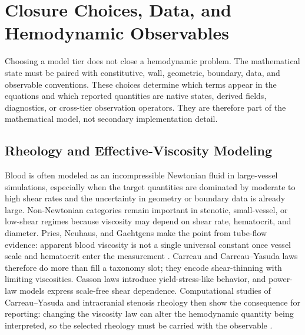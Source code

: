 \section{Closure Choices, Data, and Hemodynamic Observables}
\label{sec:modeling-closures}
\label{sec:modeling-closures-observables}

Choosing a model tier does not close a hemodynamic problem. The mathematical
state must be paired with constitutive, wall, geometric, boundary, data, and
observable conventions. These choices determine which terms appear in the
equations and which reported quantities are native states, derived fields,
diagnostics, or cross-tier observation operators. They are therefore part of the
mathematical model, not secondary implementation detail.

\subsection{Rheology and Effective-Viscosity Modeling}
\label{subsec:constitutive-wall-closures}

Blood is often modeled as an incompressible Newtonian fluid in large-vessel
simulations, especially when the target quantities are dominated by moderate to
high shear rates and the uncertainty in geometry or boundary data is already
large. Non-Newtonian categories remain important in stenotic, small-vessel, or
low-shear regimes because viscosity may depend on shear rate, hematocrit, and
diameter. Pries, Neuhaus, and Gaehtgens make the point from tube-flow evidence:
apparent blood viscosity is not a single universal constant once vessel scale
and hematocrit enter the measurement
\cite{PriesEtAl1992BloodViscosityTubeFlow}. Carreau and Carreau--Yasuda laws
therefore do more than fill a taxonomy slot; they encode shear-thinning with
limiting viscosities. Casson laws introduce yield-stress-like behavior, and
power-law models express scale-free shear dependence. Computational studies of
Carreau--Yasuda and intracranial stenosis rheology then show the consequence
for reporting: changing the viscosity law can alter the hemodynamic quantity
being interpreted, so the selected rheology must be carried with the observable
\cite{KumarEtAl2019CarreauYasudaHemodynamics,LiuEtAl2021ICASRheology}.

